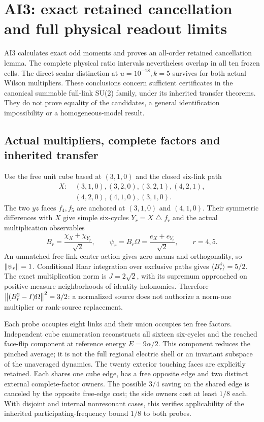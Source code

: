 \section{AI3: exact retained cancellation and full physical readout limits\workstar}
AI3 calculates exact odd moments and proves an all-order retained cancellation lemma. The complete physical ratio intervals nevertheless overlap in all ten frozen cells. The direct scalar distinction at $u=10^{-18},k=5$ survives for both actual Wilson multipliers. These conclusions concern sufficient certificates in the canonical summable full-link SU(2) family, under its inherited transfer theorems. They do not prove equality of the candidates, a general identification impossibility or a homogeneous-model result.

\subsection{Actual multipliers, complete factors and inherited transfer}
Use the free unit cube based at $(3,1,0)$ and the closed six-link path
\begin{equation*}
 \begin{split}
 X:\ &(3,1,0),(3,2,0),(3,2,1),(4,2,1),\\
      &(4,2,0),(4,1,0),(3,1,0).
 \end{split}
\end{equation*}
The two $yz$ faces $f_4,f_5$ are anchored at $(3,1,0)$ and $(4,1,0)$. Their symmetric differences with $X$ give simple six-cycles $Y_r=X\mathbin{\triangle}f_r$ and the actual multiplication observables
\begin{equation}
 B_r=\frac{\chi_X+\chi_{Y_r}}{\sqrt2},\qquad
 \psi_r=B_r\Omega=\frac{e_X+e_{Y_r}}{\sqrt2},\qquad r=4,5.
 \label{eq:ai3-sources}
\end{equation}
An unmatched free-link center action gives zero means and orthogonality, so $\left\lVert\psi_r\right\rVert=1$. Conditional Haar integration over exclusive paths gives $\langle B_r^4\rangle=5/2$. The exact multiplication norm is $J=2\sqrt2$, with its supremum approached on positive-measure neighborhoods of identity holonomies. Therefore $\left\lVert(B_r^2-I)\Omega\right\rVert^2=3/2$: a normalized source does not authorize a norm-one multiplier or rank-source replacement.

Each probe occupies eight links and their union occupies ten free factors. Independent cube enumeration reconstructs all sixteen six-cycles and the reached face-flip component at reference energy $E=9\alpha/2$. This component reduces the pinched average; it is not the full regional electric shell or an invariant subspace of the unaveraged dynamics. The twenty exterior touching faces are explicitly retained. Each shares one cube edge, has a free opposite edge and two distinct external complete-factor owners. The possible $3/4$ saving on the shared edge is canceled by the opposite free-edge cost; the side owners cost at least $1/8$ each. With disjoint and internal nonresonant cases, this verifies applicability of the inherited participating-frequency bound $1/8$ to both probes.

